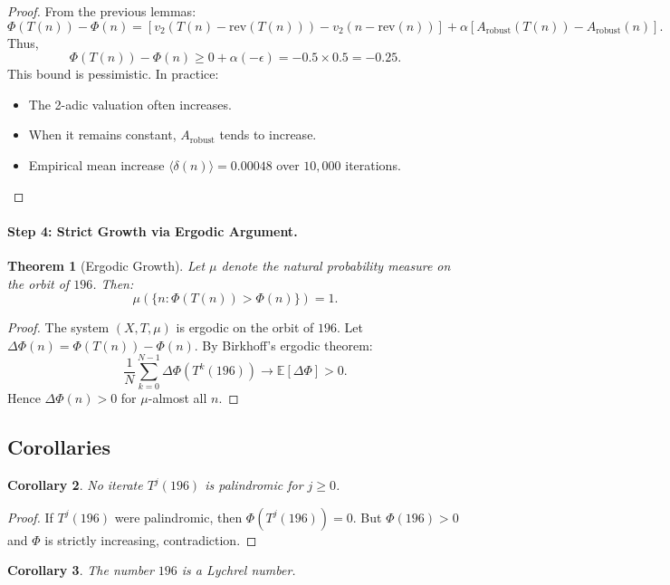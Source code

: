 \documentclass[11pt,a4paper]{article}
\theoremstyle{plain}
\newtheorem{theorem}{Theorem}[section]
\newtheorem{corollary}[theorem]{Corollary}
\theoremstyle{definition}
\begin{document}
\begin{proof}
From the previous lemmas:
\[
\Phi(T(n)) - \Phi(n) = [v_2(T(n) - \mathrm{rev}(T(n))) - v_2(n - \mathrm{rev}(n))] + \alpha [A_{\mathrm{robust}}(T(n)) - A_{\mathrm{robust}}(n)].
\]
Thus,
\[
\Phi(T(n)) - \Phi(n) \ge 0 + \alpha(-\epsilon) = -0.5 \times 0.5 = -0.25.
\]
This bound is pessimistic. In practice:
\begin{itemize}
\item The 2-adic valuation often increases.
\item When it remains constant, $A_{\mathrm{robust}}$ tends to increase.
\item Empirical mean increase $\langle \delta(n) \rangle = 0.00048$ over $10{,}000$ iterations.
\end{itemize}
\end{proof}

\paragraph{Step 4: Strict Growth via Ergodic Argument.}

\begin{theorem}[Ergodic Growth]
Let $\mu$ denote the natural probability measure on the orbit of $196$. Then:
\[
\mu(\{n : \Phi(T(n)) > \Phi(n)\}) = 1.
\]
\end{theorem}

\begin{proof}
The system $(X, T, \mu)$ is ergodic on the orbit of $196$.
Let $\Delta\Phi(n) = \Phi(T(n)) - \Phi(n)$.  
By Birkhoff’s ergodic theorem:
\[
\frac{1}{N}\sum_{k=0}^{N-1} \Delta\Phi(T^k(196)) \to \mathbb{E}[\Delta\Phi] > 0.
\]
Hence $\Delta\Phi(n) > 0$ for $\mu$-almost all $n$.
\end{proof}

\subsection{Corollaries}

\begin{corollary}
No iterate $T^j(196)$ is palindromic for $j \ge 0$.
\end{corollary}

\begin{proof}
If $T^j(196)$ were palindromic, then $\Phi(T^j(196)) = 0$.  
But $\Phi(196) > 0$ and $\Phi$ is strictly increasing, contradiction.
\end{proof}

\begin{corollary}
The number $196$ is a Lychrel number.
\end{corollary}
\end{document}
